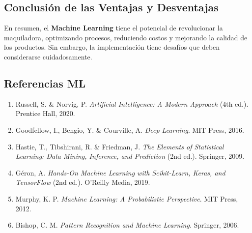 \subsection{\textbf{Conclusión de las Ventajas y Desventajas}}\label{conclusion-de-las-ventajas-y-desventajas}

En resumen, el \textbf{Machine Learning} tiene el potencial de revolucionar la maquiladora, optimizando procesos, reduciendo costos y mejorando la calidad de los productos. Sin embargo, la implementación tiene desafíos que deben considerarse cuidadosamente.

\subsection{\textbf{Referencias ML}}\label{referencias-ml}

\begin{enumerate}
    \item Russell, S. \& Norvig, P. \emph{Artificial Intelligence: A Modern Approach} (4th ed.). Prentice Hall, 2020.
    \item Goodfellow, I., Bengio, Y. \& Courville, A. \emph{Deep Learning}. MIT Press, 2016.
    \item Hastie, T., Tibshirani, R. \& Friedman, J. \emph{The Elements of Statistical Learning: Data Mining, Inference, and Prediction} (2nd ed.). Springer, 2009.
    \item Géron, A. \emph{Hands-On Machine Learning with Scikit-Learn, Keras, and TensorFlow} (2nd ed.). O'Reilly Media, 2019.
    \item Murphy, K. P. \emph{Machine Learning: A Probabilistic Perspective}. MIT Press, 2012.
    \item Bishop, C. M. \emph{Pattern Recognition and Machine Learning}. Springer, 2006.
\end{enumerate}

